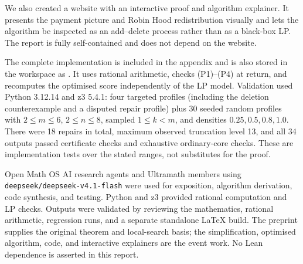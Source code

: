 \documentclass[11pt,a4paper]{article}
\theoremstyle{definition}
\theoremstyle{remark}
\begin{document}
We also created a website with an interactive proof and algorithm explainer. It presents the payment picture and Robin Hood redistribution visually and lets the algorithm be inspected as an add--delete process rather than as a black-box LP. The report is fully self-contained and does not depend on the website.

The complete implementation is included in the appendix and is also stored in the workspace as . It uses rational arithmetic, checks (P1)--(P4) at return, and recomputes the optimised score independently of the LP model. Validation used Python 3.12.14 and z3 5.4.1: four targeted profiles (including the deletion counterexample and a disputed repair profile) plus 30 seeded random profiles with $2\le m\le6$, $2\le n\le8$, sampled $1\le k<m$, and densities $0.25,0.5,0.8,1.0$. There were 18 repairs in total, maximum observed truncation level 13, and all 34 outputs passed certificate checks and exhaustive ordinary-core checks. These are implementation tests over the stated ranges, not substitutes for the proof.

Open Math OS AI research agents and Ultramath members using \texttt{deepseek/deepseek-v4.1-flash} were used for exposition, algorithm derivation, code synthesis, and testing. Python and z3 provided rational computation and LP checks. Outputs were validated by reviewing the mathematics, rational arithmetic, regression runs, and a separate standalone LaTeX build. The preprint supplies the original theorem and local-search basis; the simplification, optimised algorithm, code, and interactive explainers are the event work. No Lean dependence is asserted in this report.
\end{document}
